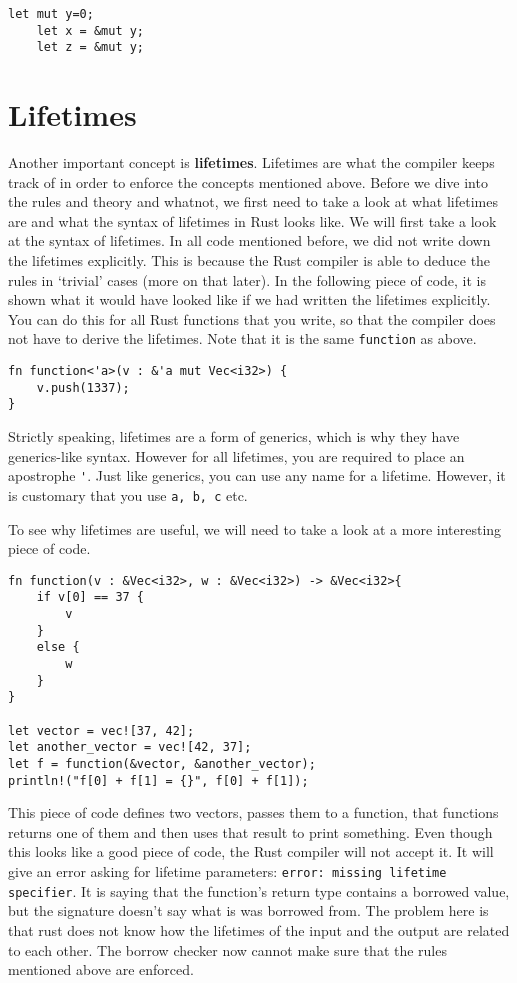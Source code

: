 \begin{verbatim}
let mut y=0;
	let x = &mut y; 
	let z = &mut y;
\end{verbatim}

\section{Lifetimes}
Another important concept is \textbf{lifetimes}. 
Lifetimes are what the compiler keeps track of in order to enforce the concepts mentioned above. Before we dive into the rules and theory and whatnot, we first need to take a look at what lifetimes are and what the syntax of lifetimes in Rust looks like. 
We will first take a look at the syntax of lifetimes. In all code mentioned before, we did not write down the lifetimes explicitly. This is because the Rust compiler is able to deduce the rules in `trivial' cases (more on that later). In the following piece of code, it is shown what it would have looked like if we had written the lifetimes explicitly. You can do this for all Rust functions that you write, so that the compiler does not have to derive the lifetimes. Note that it is the same \verb|function| as above. 

\begin{verbatim}
fn function<'a>(v : &'a mut Vec<i32>) {
    v.push(1337);
}
\end{verbatim}

Strictly speaking, lifetimes are a form of generics, which is why they have generics-like syntax.  However for all lifetimes, you are required to place an apostrophe \verb|'|. Just like generics, you can use any name for a lifetime. However, it is customary that you use \verb|a, b, c| etc. 

To see why lifetimes are useful, we will need to take a look at a more interesting piece of code. 

\begin{verbatim}
fn function(v : &Vec<i32>, w : &Vec<i32>) -> &Vec<i32>{
    if v[0] == 37 {
        v
    }
    else {
        w
    }
}

let vector = vec![37, 42];
let another_vector = vec![42, 37];
let f = function(&vector, &another_vector);
println!("f[0] + f[1] = {}", f[0] + f[1]);
\end{verbatim}

This piece of code defines two vectors, passes them to a function, that functions returns one of them and then uses that result to print something. Even though this looks like a good piece of code, the Rust compiler will not accept it. It will give an error asking for lifetime parameters: \texttt{error: missing lifetime specifier}. It is saying that the function's return type contains a borrowed value, but the signature doesn't say what is was borrowed from. The problem here is that rust does not know how the lifetimes of the input and the output are related to each other. The borrow checker now cannot make sure that the rules mentioned above are enforced. 

